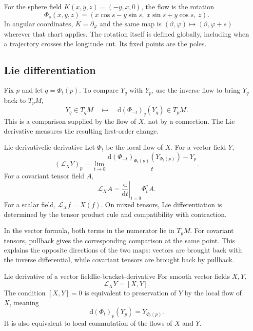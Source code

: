 \documentclass[11pt,a4paper]{article}
\numberwithin{equation}{section}
\newcommand{\dd}{\mathrm d}
\newcommand{\Lie}{\mathcal L}
\begin{document}
For the sphere field \(K(x,y,z)=(-y,x,0)\), the flow is the rotation
\[
 \Phi_s(x,y,z)=(x\cos s-y\sin s,\ x\sin s+y\cos s,\ z).
\]
In angular coordinates, \(K=\partial_\varphi\) and the same map is
\((\vartheta,\varphi)\mapsto(\vartheta,\varphi+s)\) wherever that chart
applies. The rotation itself is defined globally, including when a
trajectory crosses the longitude cut. Its fixed points are the poles.

\subsection{Lie differentiation}

Fix \(p\) and let \(q=\Phi_t(p)\). To compare \(Y_q\) with \(Y_p\),
use the inverse flow to bring \(Y_q\) back to \(T_pM\),
\[
 Y_q\in T_qM
 \quad\longmapsto\quad
 \dd(\Phi_{-t})_q(Y_q)\in T_pM.
\]
This is a comparison supplied by the flow of \(X\), not by a connection.
The Lie derivative measures the resulting first-order change.

\begin{definition}{Lie derivative}{lie-derivative}
Let \(\Phi_t\) be the local flow of \(X\). For a vector field \(Y\),
\[
 (\Lie_XY)_p
 =\lim_{t\to0}
 \frac{\dd(\Phi_{-t})_{\Phi_t(p)}(Y_{\Phi_t(p)})-Y_p}{t}.
\]
For a covariant tensor field \(A\),
\[
 \Lie_XA=\left.\frac{\dd}{\dd t}\right|_{t=0}\Phi_t^*A.
\]
For a scalar field, \(\Lie_Xf=X(f)\). On mixed tensors, Lie
differentiation is determined by the tensor product rule and
compatibility with contraction.
\end{definition}

In the vector formula, both terms in the numerator lie in \(T_pM\).
For covariant tensors, pullback gives the corresponding comparison at
the same point. This explains the opposite directions of the two maps:
vectors are brought back with the inverse differential, while covariant
tensors are brought back by pullback.


\begin{theorem}{Lie derivative of a vector field}{lie-bracket-derivative}
For smooth vector fields \(X,Y\),
\[
 \Lie_XY=[X,Y].
\]
The condition \([X,Y]=0\) is equivalent to preservation of \(Y\) by
the local flow of \(X\), meaning
\[
 \dd(\Phi_t)_p(Y_p)=Y_{\Phi_t(p)}.
\]
It is also equivalent to local commutation of the flows of \(X\) and
\(Y\).
\end{theorem}
\end{document}
